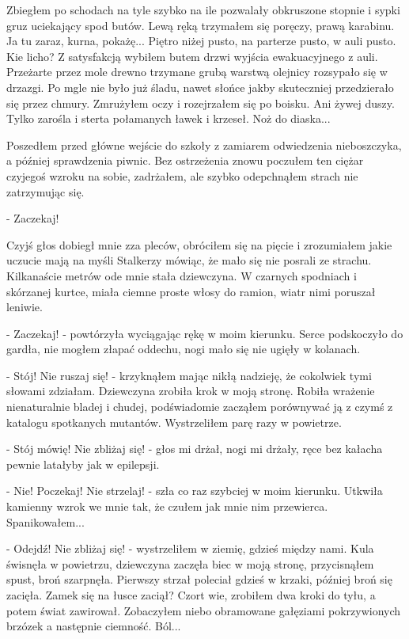 \documentclass[../MAIN.tex]{subfiles}
\begin{document}
Zbiegłem po schodach na tyle szybko na ile pozwalały obkruszone stopnie i sypki gruz uciekający spod butów. Lewą ręką trzymałem się poręczy, prawą karabinu. Ja tu zaraz, kurna, pokażę... Piętro niżej pusto, na parterze pusto, w auli pusto. Kie licho? Z satysfakcją wybiłem butem drzwi wyjścia ewakuacyjnego z auli. Przeżarte przez mole drewno trzymane grubą warstwą olejnicy rozsypało się w drzazgi. Po mgle nie było już śladu, nawet słońce jakby skuteczniej przedzierało się przez chmury. Zmrużyłem oczy i rozejrzałem się po boisku. Ani żywej duszy. Tylko zarośla i sterta połamanych ławek i krzeseł. Noż do diaska...

Poszedłem przed główne wejście do szkoły z zamiarem odwiedzenia nieboszczyka, a później sprawdzenia piwnic. Bez ostrzeżenia znowu poczułem ten ciężar czyjegoś wzroku na sobie, zadrżałem, ale szybko odepchnąłem strach nie zatrzymując się.

- Zaczekaj!

Czyjś głos dobiegł mnie zza pleców, obróciłem się na pięcie i zrozumiałem jakie uczucie mają na myśli Stalkerzy mówiąc, że mało się nie posrali ze strachu. Kilkanaście metrów ode mnie stała dziewczyna. W czarnych spodniach i skórzanej kurtce, miała ciemne proste włosy do ramion, wiatr nimi poruszał leniwie.

- Zaczekaj! - powtórzyła wyciągając rękę w moim kierunku. Serce podskoczyło do gardła, nie mogłem złapać oddechu, nogi mało się nie ugięły w kolanach.

- Stój! Nie ruszaj się! - krzyknąłem mając nikłą nadzieję, że cokolwiek tymi słowami zdziałam. Dziewczyna zrobiła krok w moją stronę. Robiła wrażenie nienaturalnie bladej i chudej, podświadomie zacząłem porównywać ją z czymś z katalogu spotkanych mutantów. Wystrzeliłem parę razy w powietrze.

- Stój mówię! Nie zbliżaj się! - głos mi drżał, nogi mi drżały, ręce bez kałacha pewnie latałyby jak w epilepsji.

- Nie! Poczekaj! Nie strzelaj! - szła co raz szybciej w moim kierunku. Utkwiła kamienny wzrok we mnie tak, że czułem jak mnie nim przewierca. Spanikowałem...

- Odejdź! Nie zbliżaj się! - wystrzeliłem w ziemię, gdzieś między nami. Kula świsnęła w powietrzu, dziewczyna zaczęła biec w moją stronę, przycisnąłem spust, broń szarpnęła. Pierwszy strzał poleciał gdzieś w krzaki, później broń się zacięła. Zamek się na łusce zaciął? Czort wie, zrobiłem dwa kroki do tyłu, a potem świat zawirował. Zobaczyłem niebo obramowane gałęziami pokrzywionych brzózek a następnie ciemność. Ból...
\end{document}
